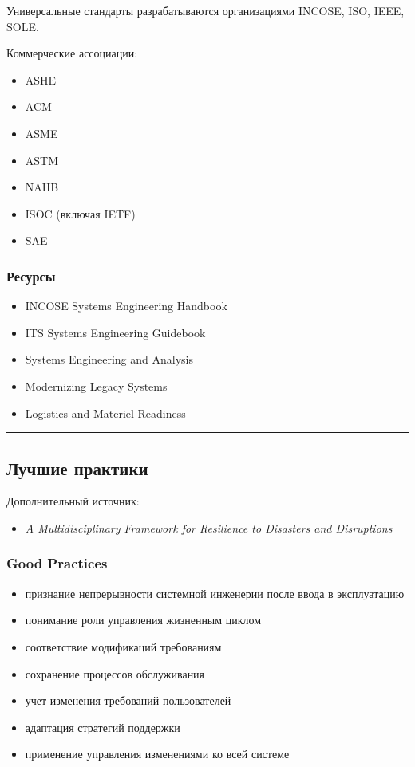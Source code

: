 \documentclass[14pt,a4paper]{extarticle}
\begin{document}
Универсальные стандарты разрабатываются организациями INCOSE, ISO, IEEE, SOLE.

Коммерческие ассоциации:

\begin{itemize}
\item ASHE
\item ACM
\item ASME
\item ASTM
\item NAHB
\item ISOC (включая IETF)
\item SAE
\end{itemize}

\subsubsection{Ресурсы}

\begin{itemize}
\item INCOSE Systems Engineering Handbook
\item ITS Systems Engineering Guidebook
\item Systems Engineering and Analysis
\item Modernizing Legacy Systems
\item Logistics and Materiel Readiness
\end{itemize}

\hrule

\subsection{Лучшие практики}

Дополнительный источник:

\begin{itemize}
\item \textit{A Multidisciplinary Framework for Resilience to Disasters and Disruptions}
\end{itemize}

\subsubsection{Good Practices}

\begin{itemize}
\item признание непрерывности системной инженерии после ввода в эксплуатацию
\item понимание роли управления жизненным циклом
\item соответствие модификаций требованиям
\item сохранение процессов обслуживания
\item учет изменения требований пользователей
\item адаптация стратегий поддержки
\item применение управления изменениями ко всей системе
\end{itemize}
\end{document}
